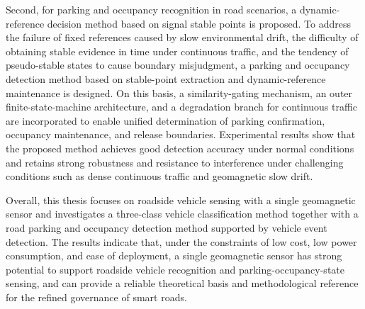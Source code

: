 Second, for parking and occupancy recognition in road scenarios, a dynamic-reference decision method based on signal stable points is proposed. To address the failure of fixed references caused by slow environmental drift, the difficulty of obtaining stable evidence in time under continuous traffic, and the tendency of pseudo-stable states to cause boundary misjudgment, a parking and occupancy detection method based on stable-point extraction and dynamic-reference maintenance is designed. On this basis, a similarity-gating mechanism, an outer finite-state-machine architecture, and a degradation branch for continuous traffic are incorporated to enable unified determination of parking confirmation, occupancy maintenance, and release boundaries. Experimental results show that the proposed method achieves good detection accuracy under normal conditions and retains strong robustness and resistance to interference under challenging conditions such as dense continuous traffic and geomagnetic slow drift.

Overall, this thesis focuses on roadside vehicle sensing with a single geomagnetic sensor and investigates a three-class vehicle classification method together with a road parking and occupancy detection method supported by vehicle event detection. The results indicate that, under the constraints of low cost, low power consumption, and ease of deployment, a single geomagnetic sensor has strong potential to support roadside vehicle recognition and parking-occupancy-state sensing, and can provide a reliable theoretical basis and methodological reference for the refined governance of smart roads.
